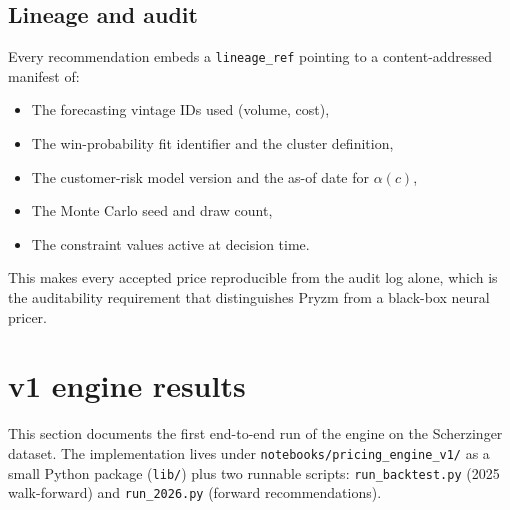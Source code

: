 \documentclass[11pt,a4paper]{article}
\begin{document}
\subsection{Lineage and audit}
Every recommendation embeds a \texttt{lineage\_ref} pointing to a content-addressed manifest of:
\begin{itemize}[leftmargin=2em,itemsep=2pt]
  \item The forecasting vintage IDs used (volume, cost),
  \item The win-probability fit identifier and the cluster definition,
  \item The customer-risk model version and the as-of date for $\alpha(c)$,
  \item The Monte Carlo seed and draw count,
  \item The constraint values active at decision time.
\end{itemize}
This makes every accepted price reproducible from the audit log alone, which is the auditability requirement that distinguishes Pryzm from a black-box neural pricer.

\section{v1 engine results}
\label{sec:v1results}

This section documents the first end-to-end run of the engine on the Scherzinger dataset. The implementation lives under \texttt{notebooks/pricing\_engine\_v1/} as a small Python package (\texttt{lib/}) plus two runnable scripts: \texttt{run\_backtest.py} (2025 walk-forward) and \texttt{run\_2026.py} (forward recommendations).
\end{document}
